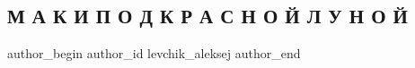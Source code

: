  
 
 
 
 
 
\subsection{М А К И   П О Д   К Р А С Н О Й   Л У Н О Й}
\label{sec:11_06_2021.fb.levchik_aleksej.1.maki_pod_krasnoj_lunoj}
\ifcmt
 author_begin
   author_id levchik_aleksej
 author_end
\fi

